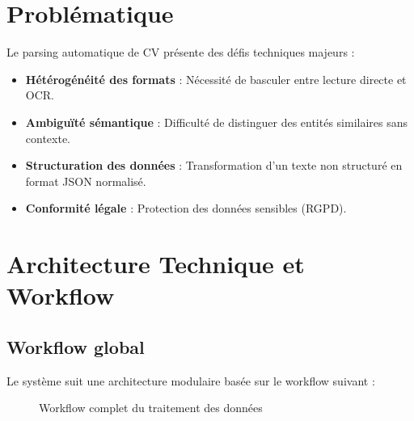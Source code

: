 \documentclass[12pt,a4paper]{report}
\begin{document}
\chapter{Problématique}

Le parsing automatique de CV présente des défis techniques majeurs :
\begin{itemize}
    \item \textbf{Hétérogénéité des formats} : Nécessité de basculer entre lecture directe et OCR.
    \item \textbf{Ambiguïté sémantique} : Difficulté de distinguer des entités similaires sans contexte.
    \item \textbf{Structuration des données} : Transformation d'un texte non structuré en format JSON normalisé.
    \item \textbf{Conformité légale} : Protection des données sensibles (RGPD).
\end{itemize}

\chapter{Architecture Technique et Workflow}

\section{Workflow global}
Le système suit une architecture modulaire basée sur le workflow suivant :
\begin{figure}[H]
    \centering
    \caption{Workflow complet du traitement des données}
\end{figure}
\end{document}
